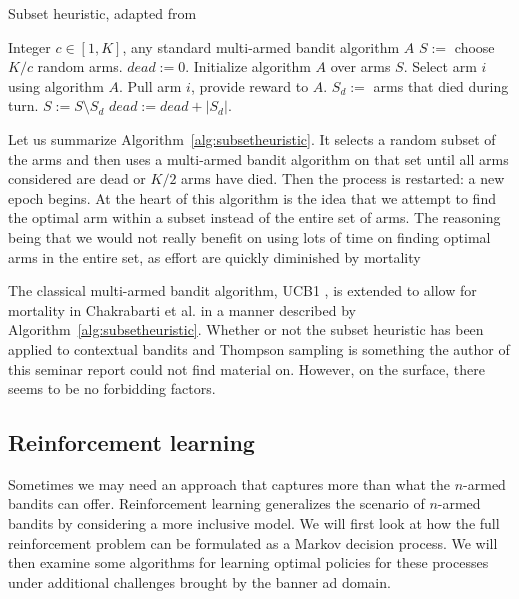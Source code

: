 \documentclass{article} %
\begin{document}
\begin{algorithm}
  \caption{Subset heuristic, adapted from \cite{chakrabarti2008mortal}}
  \label{alg:subsetheuristic}
  \begin{algorithmic}[1]
    \Require Integer $c \in [1,K]$, any standard multi-armed bandit algorithm
    $A$
      \State $S := $ choose $K/c$ random arms.
      \State $dead := 0$.
      \State Initialize algorithm $A$ over arms $S$.
      \Repeat
        \State Select arm $i$ using algorithm $A$.
        \State Pull arm $i$, provide reward to $A$.
        \State $S_d :=$ arms that died during turn.
        \State $S := S \setminus S_d$
        \State $dead := dead + |S_d|$.
    \EndFor
  \end{algorithmic}
\end{algorithm}

Let us summarize Algorithm~\ref{alg:subsetheuristic}. It selects a random
subset of the arms and then uses a multi-armed bandit algorithm on that set
until all arms considered are dead or $K/2$ arms have died. Then the process is
restarted: a new epoch begins. At the heart of this algorithm is the idea that
we attempt to find the optimal arm within a subset instead of the entire set of
arms. The reasoning being that we would not really benefit on using lots of
time on finding optimal arms in the entire set, as effort are quickly
diminished by mortality

The classical multi-armed bandit algorithm, UCB1 \cite{auer2002finite}, is
extended to allow for mortality in Chakrabarti et al.
\cite{chakrabarti2008mortal} in a manner described by
Algorithm~\ref{alg:subsetheuristic}. Whether or not the subset heuristic has
been applied to contextual bandits and Thompson sampling is something the
author of this seminar report could not find material on. However, on the
surface, there seems to be no forbidding factors.

\subsection{Reinforcement learning}

Sometimes we may need an approach that captures more than what the $n$-armed
bandits can offer. Reinforcement learning generalizes the scenario of $n$-armed
bandits by considering a more inclusive model. We will first look at how the
full reinforcement problem can be formulated as a Markov decision process. We
will then examine some algorithms for learning optimal policies for these
processes under additional challenges brought by the banner ad domain.
\end{document}
